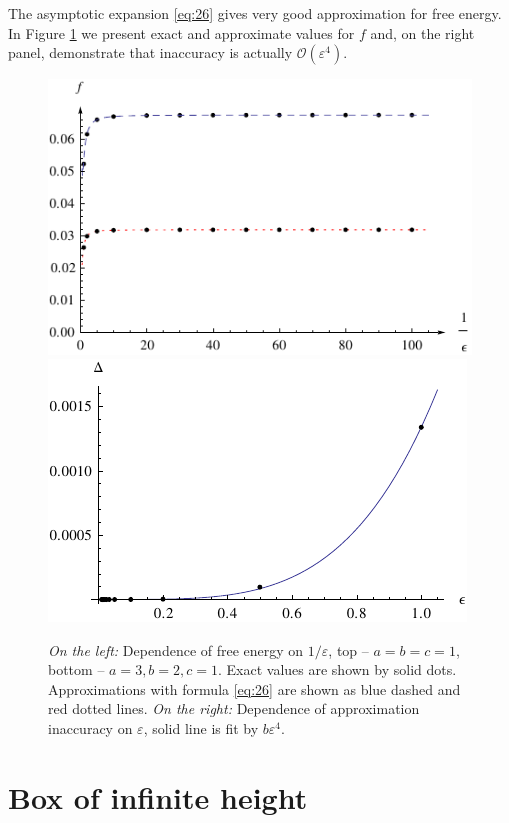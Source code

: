 \documentclass{article}
\begin{document}
The asymptotic expansion \eqref{eq:26} gives very good approximation for free energy. In Figure
\ref{fig:approx-acc} we present exact and approximate values for $f$ and, on the right panel,
demonstrate that inaccuracy is actually $\mathcal{O}(\varepsilon^{4})$. 

\begin{figure}[htbp]
  \includegraphics[scale=0.9]{exact-vs-approximation}
  \includegraphics{error-1}
  \caption{\label{fig:approx-acc} {\it On the left:} Dependence of free energy on $1/\varepsilon$,
    top -- $a=b=c=1$, bottom -- $a=3, b=2, c=1$. Exact values are shown by solid dots.
    Approximations with formula \eqref{eq:26} are shown as blue dashed and red dotted lines. {\it On
      the right:} Dependence of approximation inaccuracy on $\varepsilon$, solid line is fit by $b\varepsilon^{4}$.}
\end{figure}

\section{Box of infinite height}
\label{sec:gener-other-doma}
\end{document}
